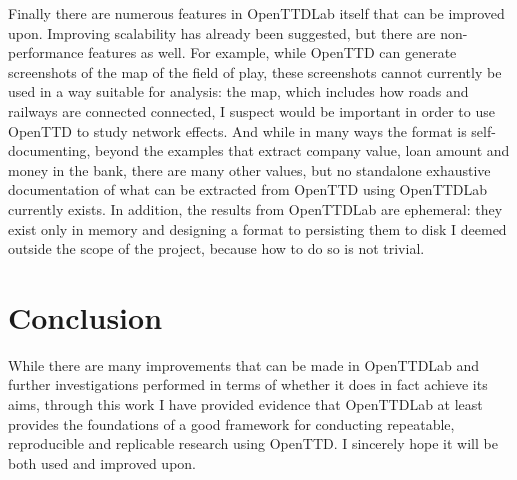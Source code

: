 \documentclass[logo,msc,dsti]{style/infthesis}    %
\begin{document}
{Finally there are numerous features in OpenTTDLab itself that can be improved upon. Improving scalability has already been suggested, but there are non-performance features as well. For example, while OpenTTD can generate screenshots of the map of the field of play, these screenshots cannot currently be used in a way suitable for analysis: the map, which includes how roads and railways are connected connected, I suspect would be important in order to use OpenTTD to study network effects. And while in many ways the format is  self-documenting, beyond the examples that extract company value, loan amount and money in the bank, there are many other values, but no standalone exhaustive documentation of what can be extracted from OpenTTD using OpenTTDLab currently exists. In addition, the results from OpenTTDLab are ephemeral: they exist only in memory and designing a format to persisting them to disk I deemed outside the scope of the project, because how to do so is not trivial.

\chapter{Conclusion}
\label{chapter:conclusion}

While there are many improvements that can be made in OpenTTDLab and further investigations performed in terms of whether it does in fact achieve its aims, through this work I have provided evidence that OpenTTDLab at least provides the foundations of a good framework for conducting repeatable, reproducible and replicable research using OpenTTD. I sincerely hope it will be both used and improved upon.







}
\end{document}
